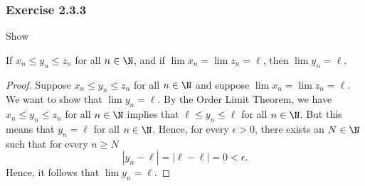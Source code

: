 \subsubsection{Exercise 2.3.3}
Show 
\begin{tcolorbox}
    \begin{thm}
        If \( x_n \leq y_n \leq z_n\) for all \( n \in \N \), and if \( \lim x_n = \lim z_n = \ell\), then \( \lim y_n = \ell\).
    \end{thm}
\end{tcolorbox}
\begin{proof}
    Suppose \( x_n \leq y_n \leq z_n\) for all \( n \in \N \) and suppose \( \lim x_n = \lim z_n = \ell\). We want to show that \( \lim y_n = \ell\). By the Order Limit Theorem, we have \( x_n \leq y_n \leq z_n \) for all \( n \in \N \) implies that \( \ell \leq y_n \leq \ell\) for all \( n \in \N \). But this means that \( y_n = \ell\) for all \( n \in \N \). Hence, for every \( \epsilon  > 0\), there exists an \( N \in \N\) such that for every \( n \geq N\) 
    \[ | y_n - \ell | = | \ell - \ell | = 0 < \epsilon.\]
    Hence, it follows that \( \lim y_n = \ell\).
\end{proof}

